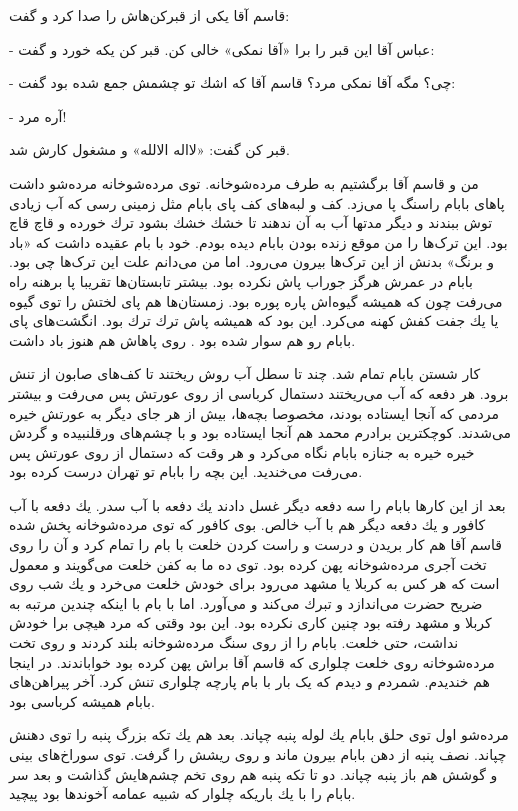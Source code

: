 \documentclass[12pt,a4paper]{book}
\begin{document}
قاسم آقا یکی از قبرکن‌هاش را صدا کرد و گفت:

- عباس آقا این قبر را برا «آقا نمکی» خالی کن. قبر کن یکه خورد و گفت:

- چی؟ مگه آقا نمکی مرد؟ قاسم آقا که اشك تو چشمش جمع شده بود گفت:

- آره مرد!

قبر کن گفت: «لااله الالله» و مشغول کارش شد.

من و قاسم آقا برگشتیم به طرف مرده‌شوخانه. توی مرده‌شوخانه مرده‌شو داشت پاهای بابام راسنگ پا می‌زد. کف و لبه‌های کف پای بابام مثل زمینی رسی که آب زیادی توش ببندند و دیگر مدتها آب به آن ندهند تا خشك خشك بشود ترك خورده و قاچ قاچ بود. این ترک‌ها را من موقع زنده بودن بابام دیده بودم. خود با بام عقیده داشت که «باد و برنگ» بدنش از این ترک‌ها بیرون می‌رود. اما من می‌دانم علت این ترک‌ها چی بود. بابام در عمرش هرگز جوراب پاش نکرده بود. بیشتر تابستان‌ها تقریبا پا برهنه راه می‌رفت چون که همیشه گيوه‌اش پاره پوره بود. زمستان‌ها هم پای لختش را توی گیوه یا يك جفت کفش کهنه می‌کرد. این بود که همیشه پاش ترك ترك بود. انگشت‌های پای بابام رو هم سوار شده بود . روی پاهاش هم هنوز باد داشت.

کار شستن بابام تمام شد. چند تا سطل آب روش ریختند تا کف‌های صابون از تنش برود. هر دفعه که آب می‌ریختند دستمال کرباسی از روی عورتش پس می‌رفت و بیشتر مردمی که آنجا ایستاده بودند، مخصوصا بچه‌ها، بیش از هر جای دیگر به عورتش خیره می‌شدند. کوچکترین برادرم محمد هم آنجا ایستاده بود و با چشم‌های ورقلنبیده و گردش خیره خیره به جنازه بابام نگاه می‌کرد و هر وقت که دستمال از روی عورتش پس می‌رفت می‌خندید. این بچه را بابام تو تهران درست کرده بود.

بعد از این کارها بابام را سه دفعه دیگر غسل دادند يك دفعه با آب سدر. يك دفعه با آب کافور و يك دفعه دیگر هم با آب خالص.
بوی کافور که توی مرده‌شوخانه پخش شده قاسم آقا هم کار بریدن و درست و راست کردن خلعت با بام را تمام
کرد و آن را روی تخت آجری مرده‌شوخانه پهن کرده بود. توی ده ما به کفن خلعت می‌گویند و معمول است که هر کس به کربلا یا مشهد می‌رود برای خودش خلعت می‌خرد و يك شب روی ضریح حضرت می‌اندازد و تبرك می‌کند و می‌آورد. اما با بام با اینکه چندین مرتبه به کربلا و مشهد رفته بود چنین کاری نکرده بود. این بود وقتی که مرد هیچی برا خودش نداشت، حتی خلعت.
بابام را از روی سنگ مرده‌شوخانه بلند کردند و روی تخت مرده‌شوخانه روی خلعت چلواری که قاسم آقا براش پهن کرده بود خواباندند. در اینجا هم خندیدم. شمردم و دیدم که یک بار با بام پارچه چلواری تنش کرد. آخر پیراهن‌های بابام همیشه کرباسی بود.

مرده‌شو اول توی حلق بابام يك لوله پنبه چپاند. بعد هم يك تكه بزرگ پنبه را توی دهنش چپاند. نصف پنبه از دهن بابام بیرون ماند و روی ریشش را گرفت. توی سوراخ‌های بینی و گوشش هم باز پنبه چپاند. دو تا تکه پنبه هم روی تخم چشم‌هایش گذاشت و بعد سر بابام را با يك باريکه چلوار که شبیه عمامه آخوندها بود پیچید.
\end{document}
